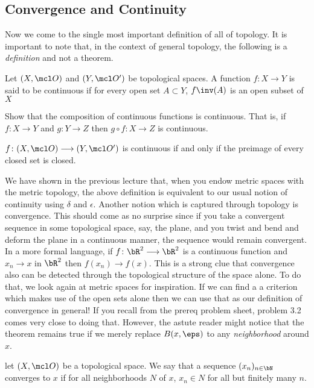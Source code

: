 \documentclass{pset}
\begin{document}
\subsection{Convergence and Continuity}
Now we come to the single most important definition of all of topology. It is important to note that, in the context of general topology, the following is a \emph{definition} and not a theorem.
\begin{definition}[continuity]
    Let $(X, \mcl O)$ and $(Y, \mcl O')$ be topological spaces. A function $f\colon X\longrightarrow Y$ is said to be continuous if for every open 
    set $A\subset Y$, $f\inv(A)$ is an open subset of $X$
\end{definition}
\begin{exercise}
Show that the composition of continuous functions is continuous. That is, if $f\colon X\longrightarrow Y$ and 
$g\colon Y\longrightarrow Z$ then $g \circ f\colon X\longrightarrow Z$ is continuous.
\end{exercise}
\begin{exercise}
    $f\colon (X, \mcl O) \longrightarrow (Y, \mcl O')$ is continuous if and only if the preimage of every closed set is closed.
\end{exercise}
We have shown in the previous lecture that, when you endow metric spaces with the metric topology, the above definition is equivalent to our usual notion of continuity using $\delta$ and $\epsilon$. Another notion which is captured through topology is convergence. This should come as no surprise since if you take a convergent sequence in some topological space, say, the plane, and you twist and bend and deform the plane in a continuous manner, the sequence would remain convergent. In a more formal language, if $f\colon \bR^2\longrightarrow\bR^2$ is a continuous function and $x_n\to x$ in $\bR^2$ then $f(x_n)\to f(x)$. This is a strong clue that convergence also can be detected through the topological structure of the space alone. To do that, we look again at metric spaces for inspiration. If we can find a a criterion which makes use of the open sets alone then we can use that as our definition of convergence in general! If you recall from the prereq problem sheet, problem 3.2 comes very close to doing that. However, the astute reader might notice that the theorem remains true if we merely replace $B(x, \eps)$ to any \emph{neighborhood} around $x$.
\begin{definition}[convergence]
    let $(X, \mcl O)$ be a topological space. We say that a sequence $(x_n)_{n\in\bN}$ converges to $x$ if for all neighborhoods $N$ of $x$, $x_n\in N$ for all but finitely many $n$.
\end{definition}
\end{document}
